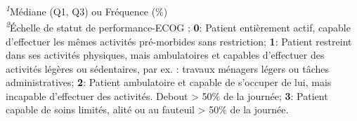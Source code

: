 \begin{minipage}{\linewidth}
\textsuperscript{\textit{1}}Médiane (Q1, Q3) ou Fréquence (\%)\\
\textsuperscript{\textit{2}}Échelle de statut de performance-ECOG ; \textbf{0}: Patient entièrement actif, capable d'effectuer les mêmes activités pré-morbides sans restriction; \textbf{1}: Patient restreint dans ses activités physiques, mais ambulatoires et capables d'effectuer des activités légères ou sédentaires, par ex. : travaux ménagers légers ou tâches administratives; \textbf{2}: Patient ambulatoire et capable de s'occuper de lui, mais incapable d'effectuer des activités. Debout \textgreater{} 50\% de la journée; \textbf{3}: Patient capable de soins limités, alité ou au fauteuil \textgreater{} 50\% de la journée.\\
\end{minipage}

